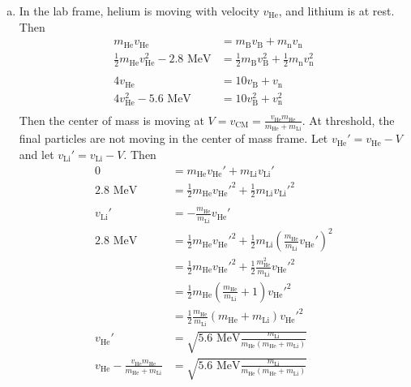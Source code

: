 \documentclass{esg8012pset}
\begin{document}
\begin{solution}
  \begin{enumerate}[a)]
    \item In the lab frame, helium is moving with velocity $v_{\text{He}}$, and lithium is at rest.  Then \begin{align*}
    m_{\text{He}}v_{\text{He}} & = m_{\text{B}}v_{\text{B}} + m_{\text{n}}v_{\text{n}} \\
    \frac{1}{2}m_{\text{He}}v_{\text{He}}^2 - 2.8\text{ MeV} & = \frac{1}{2}m_{\text{B}}v_{\text{B}}^2 + \frac{1}{2}m_{\text{n}}v_{\text{n}}^2 \\
    \\
    4v_{\text{He}} & = 10v_{\text{B}} + v_{\text{n}} \\
    4v_{\text{He}}^2 - 5.6\text{ MeV} & = 10v_{\text{B}}^2 + v_{\text{n}}^2 \\
    \end{align*}
    Then the center of mass is moving at $V = v_{\text{CM}} = \frac{v_{\text{He}} m_{\text{He}}}{m_{\text{He}} + m_{\text{Li}}}$.  At threshold, the final particles are not moving in the center of mass frame.  Let $v_{\text{He}}' = v_{\text{He}} - V$ and let $v_{\text{Li}}' = v_{\text{Li}} - V$.  Then \begin{align*}
    0 & = m_{\text{He}}v_{\text{He}}' + m_{\text{Li}}v_{\text{Li}}' \\
    2.8\text{ MeV} & = \frac{1}{2}m_{\text{He}}v_{\text{He}}'^2 + \frac{1}{2}m_{\text{Li}}v_{\text{Li}}'^2 \\
    \\
    v_{\text{Li}}' & = -\frac{m_{\text{He}}}{m_{\text{Li}}}v_{\text{He}}' \\
    2.8\text{ MeV} & = \frac{1}{2}m_{\text{He}}v_{\text{He}}'^2 + \frac{1}{2}m_{\text{Li}}\left(\frac{m_{\text{He}}}{m_{\text{Li}}}v_{\text{He}}'\right)^2 \\
      & = \frac{1}{2}m_{\text{He}}v_{\text{He}}'^2 + \frac{1}{2}\frac{m_{\text{He}}^2}{m_{\text{Li}}}v_{\text{He}}'^2 \\
      & = \frac{1}{2}m_{\text{He}}\left(\frac{m_{\text{He}}}{m_{\text{Li}}} + 1\right)v_{\text{He}}'^2 \\
      & = \frac{1}{2}\frac{m_{\text{He}}}{m_{\text{Li}}}(m_{\text{He}} + m_{\text{Li}})v_{\text{He}}'^2 \\
    v_{\text{He}}' & = \sqrt{5.6\text{ MeV}\frac{m_{\text{Li}}}{m_{\text{He}}(m_{\text{He}} + m_{\text{Li}})}} \\
    v_{\text{He}} - \frac{v_{\text{He}} m_{\text{He}}}{m_{\text{He}} + m_{\text{Li}}} & = \sqrt{5.6\text{ MeV}\frac{m_{\text{Li}}}{m_{\text{He}}(m_{\text{He}} + m_{\text{Li}})}} \\

\end{align*}
\end{enumerate}
\end{solution}
\end{document}
